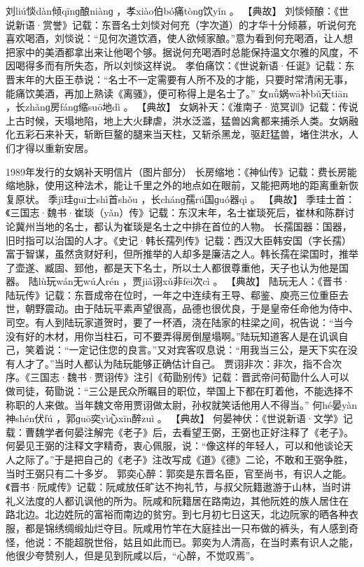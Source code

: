 \documentclass[12pt,UTF8]{ctexbook}
\begin{document}
刘liú惔dàn倾qīnɡ酿niànɡ
，孝xiào伯bó痛tònɡ饮yǐn
。
【典故】
刘惔倾酿：《世说新语·赏誉》记载：东晋名士刘惔对何充（字次道）的才华十分倾慕，听说何充喜欢喝酒，刘惔说：“见何次道饮酒，使人欲倾家酿。”意为看到何充喝酒，让人想把家中的美酒都拿出来让他喝个够。据说何充喝酒时总能保持温文尔雅的风度，不因喝得多而有所失态，所以刘惔这样说。
孝伯痛饮：《世说新语·任诞》记载：东晋末年的大臣王恭说：“名士不一定需要有人所不及的才能，只要时常清闲无事，能痛饮美酒，再加上熟读《离骚》，便可称得上是名士了。”
女nǚ娲wā补bǔ天tiān
，长zhǎnɡ房fánɡ缩suō地dì
。
【典故】
女娲补天：《淮南子·览冥训》记载：传说上古时候，天塌地陷，地上大火肆虐，洪水泛滥，猛兽凶禽都来捕杀人类。女娲融化五彩石来补天，斩断巨鳌的腿来当天柱，又斩杀黑龙，驱赶猛兽，堵住洪水，人们才得以重新安居。

1989年发行的女娲补天明信片（图片部分）
长房缩地：《神仙传》记载：费长房能缩地脉，使用这种法术，能让千里之外的地点如在眼前，又能把两地的距离重新恢复原状。
季jì珪ɡuī士shì首shǒu
，长chánɡ孺rú国ɡuó器qì
。
【典故】
季珪士首：《三国志·魏书·崔琰（yǎn）传》记载：东汉末年，名士崔琰死后，崔林和陈群讨论冀州当地的名士，都认为崔琰是名士之中排在首位的人物。
长孺国器：国器，旧时指可以治国的人才。《史记·韩长孺列传》记载：西汉大臣韩安国（字长孺）富于智谋，虽然贪财好利，但所推举的人却多是廉洁之人。韩长孺在梁国时，推举了壶遂、臧固、郅他，都是天下名士，所以士人都很尊重他，天子也认为他是国器。
陆lù玩wán无wú人rén
，贾jiǎ诩xǔ非fēi次cì
。
【典故】
陆玩无人：《晋书·陆玩传》记载：东晋成帝在位时，一年之中连续有王导、郗鉴、庾亮三位重臣去世，朝野震动。由于陆玩平素声望很高，品德也很优良，于是皇帝任命他为侍中、司空。有人到陆玩家道贺时，要了一杯酒，浇在陆家的柱梁之间，祝告说：“当今没有好的木材，用你当柱石，可不要弄得房倒屋塌啊。”陆玩知道客人是在讥讽自己，笑着说：“一定记住您的良言。”又对宾客叹息说：“用我当三公，是天下实在没有人才了。”当时人都认为陆玩能够正确估计自己。
贾诩非次：非次，指不合次序。《三国志·魏书·贾诩传》注引《荀勖别传》记载：晋武帝问荀勖什么人可以做司徒，荀勖说：“三公是民众所瞩目的职位，举国上下都在盯着他，不能选择不称职的人来做。当年魏文帝用贾诩做太尉，孙权就笑话他用人不得当。”
何hé晏yàn神shén伏fú
，郭ɡuō奕yì心xīn醉zuì
。
【典故】
何晏神伏：《世说新语·文学》记载：曹魏学者何晏注解完《老子》后，去看望王弼，王弼也正好注释了《老子》。何晏见王弼的注释文字精奇，衷心佩服，说：“像这样的年轻人，可以和他谈论天人之际了。”于是把自己的《老子》注改写成《道》《德》二论，不敢和王弼争胜，当时王弼只有二十多岁。
郭奕心醉：郭奕是东晋名臣，官至尚书，有识人之能。《晋书·阮咸传》记载：阮咸放任旷达不拘礼节，与叔父阮籍遨游于山林，当时讲礼义法度的人都讥讽他的所为。阮咸和阮籍居在路南边，其他阮姓的族人居住在
路北边。北边姓阮的富裕而南边的贫穷。到七月初七日这天，北边阮家的晒各种衣服，都是锦绣绸缎灿烂夺目。阮咸用竹竿在大庭挂出一只布做的裤头，有人感到奇怪，他说：不能超脱世俗，姑且如此而已。郭奕为人清高，在当时素有识人之能，他很少夸赞别人，但是见到阮咸以后，“心醉，不觉叹焉”。
\end{document}
